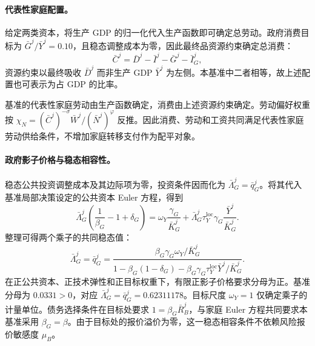 \documentclass[12pt,UTF8]{ctexart}
\begin{document}
	\paragraph{代表性家庭配置。}
	给定两类资本，将生产 GDP 的归一化代入生产函数即可确定总劳动。政府消费目标为 $\bar G^j/\bar Y^j=0.10$，且稳态调整成本为零，因此最终品资源约束确定总消费：
	\begin{equation}
		\bar C^j=\bar D^j-\bar I^j-\bar G^j-\bar I_G^j,
	\end{equation}
	资源约束以最终吸收 $\bar D^j$ 而非生产 GDP $\bar Y^j$ 为左侧。本基准中二者相等，故上述配置也可表示为占 GDP 的比率。
	
	基准的代表性家庭劳动由生产函数确定，消费由上述资源约束确定。劳动偏好权重按 $\chi_N=(\bar C^j)^{-\sigma}\bar W^j/(\bar N^j)^{\varphi}$ 反推。因此消费、劳动和工资共同满足代表性家庭劳动供给条件，不增加家庭转移支付作为配平对象。
	
	\paragraph{政府影子价格与稳态相容性。}
	稳态公共投资调整成本及其边际项为零，投资条件因而化为 $\bar\Lambda_G^j=\bar q_G^j$。将其代入基准局部决策设定的公共资本 Euler 方程，得到
	\begin{equation}
		\bar\Lambda_G^j\left(\frac{1}{\beta_G}-1+\delta_G\right)
		=
		\omega_Y\frac{\gamma_G}{\bar K_G^j}
		+
		\bar\Lambda_G^j\tau_Y^{\mathrm{loc}}\gamma_G\frac{\bar Y^j}{\bar K_G^j}.
	\end{equation}
	整理可得两个乘子的共同稳态值：
	\begin{equation}
		\bar\Lambda_G^j
		=\bar q_G^j
		=
		\frac{\beta_G\gamma_G\omega_Y/\bar K_G^j}
		{1-\beta_G(1-\delta_G)-\beta_G\gamma_G\tau_Y^{\mathrm{loc}}\bar Y^j/\bar K_G^j}.
	\end{equation}
	在正公共资本、正技术弹性和正目标权重下，有限正影子价格要求分母为正。基准分母为 $0.0331>0$，对应 $\bar\Lambda_G^j=\bar q_G^j=0.62311178$。目标尺度 $\omega_Y=1$ 仅确定乘子的计量单位。债务选择条件在目标处要求 $1=\beta_G\bar R_B^j$，与家庭 Euler 方程共同要求本基准采用 $\beta_G=\beta$。由于目标处的报价溢价为零，这一稳态相容条件不依赖风险报价敏感度 $\mu_B$。
	
\end{document}
